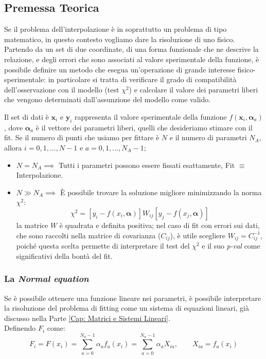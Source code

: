 \subsection{Premessa Teorica}
Se il problema dell'interpolazione è in soprattutto un problema di tipo matematico, in questo contesto vogliamo dare la risoluzione di uno fisico. Partendo da un set di due coordinate, di una forma funzionale che ne descrive la relazione, e degli errori che sono associati al valore sperimentale della funzione, è possibile definire un metodo che esegua un'operazione di grande interesse fisico-sperimentale: in particolare si tratta di verificare il grado di compatibilità dell'osservazione con il modello (test $\chi^2$) e calcolare il valore dei parametri liberi che vengono determinati dall'assunzione del modello come valido.

\medskip
Il set di dati è $\boldsymbol{x}_i$ e $\boldsymbol{y}_i$ rappresenta il valore sperimentale della funzione $f(\boldsymbol{x}_i, \boldsymbol{\alpha}_a)$, dove $\boldsymbol{\alpha}_a$ è il vettore dei parametri liberi, quelli che desideriamo stimare con il fit. Se il numero di punti che usiamo per fittare è $N$ e il numero di parametri $N_A$, allora $i = 0, 1, \dots, N-1$  e $a = 0, 1, \dots ,N_A-1$; 
\begin{itemize}
    \item $N = N_A \implies$ Tutti i parametri possono essere fissati esattamente, Fit $\equiv$ Interpolazione.
    \item $N \gg N_A \implies$ È possibile trovare la soluzione migliore minimizzando la norma $\chi^2$:
    $$\chi^2 = [y_i - f(x_i, \boldsymbol{\alpha})] W_{ij} [y_j - f(x_j, \boldsymbol{\alpha})]$$
    la matrice $W$ è quadrata e definita positiva; nel caso di fit con errori sui dati, che sono raccolti nella matrice di covarianza ($C_{ij}$), è utile scegliere $W_{ij}=C_{ij}^{-1}$, poiché questa scelta permette di interpretare il test del $\chi^2$ e il suo \textit{p-val} come significativi della bontà del fit.
\end{itemize}

\subsubsection{La \textit{Normal equation}}
Se è possibile ottenere una funzione lineare nei parametri, è possibile interpretare la risoluzione del problema di fitting come un sistema di equazioni lineari, già discusso nella Parte \ref{Cap: Matrici e Sistemi Lineari}.\\
Definendo $F_i$ come:
\[
F_i = F(x_i) = \sum_{a=0}^{N_a-1} \alpha_a f_a(x_i) =
\sum_{a=0}^{N_a-1} \alpha_a X_{ia}, \quad \quad X_{ia} = f_a(x_i)
\]


